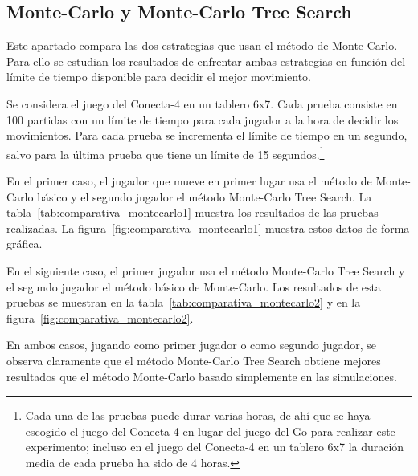 \subsection{Monte-Carlo y Monte-Carlo Tree Search}
\label{ssec:comparativa_mcVSmctreesearch}
Este apartado compara las dos estrategias que usan el método de Monte-Carlo.
Para ello se estudian los resultados de enfrentar ambas estrategias en función del límite de tiempo disponible para decidir el mejor movimiento.

Se considera el juego del Conecta-4 en un tablero 6x7.
Cada prueba consiste en 100 partidas con un límite de tiempo para cada jugador a la hora de decidir los movimientos.
Para cada prueba se incrementa el límite de tiempo en un segundo, salvo para la última prueba que tiene un límite de 15 segundos.\footnote{Cada una de las pruebas puede durar varias horas, de ahí que se haya escogido el juego del Conecta-4 en lugar del juego del Go para realizar este experimento; incluso en el juego del Conecta-4 en un tablero 6x7 la duración media de cada prueba ha sido de 4 horas.}

En el primer caso, el jugador que mueve en primer lugar usa el método de Monte-Carlo básico y el segundo jugador el método Monte-Carlo Tree Search.
La tabla~\ref{tab:comparativa_montecarlo1} muestra los resultados de las pruebas realizadas.
La figura~\ref{fig:comparativa_montecarlo1} muestra estos datos de forma gráfica.

En el siguiente caso, el primer jugador usa el método Monte-Carlo Tree Search y el segundo jugador el método básico de Monte-Carlo.
Los resultados de esta pruebas se muestran en la tabla~\ref{tab:comparativa_montecarlo2} y en la figura~\ref{fig:comparativa_montecarlo2}.

En ambos casos, jugando como primer jugador o como segundo jugador, se observa claramente que el método Monte-Carlo Tree Search obtiene mejores resultados que el método Monte-Carlo basado simplemente en las simulaciones.

